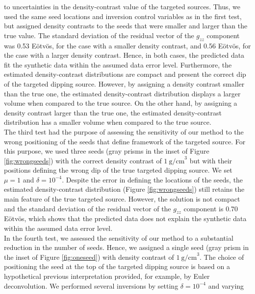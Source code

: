to uncertainties in the density-contrast value of the targeted sources.
Thus, we used the same seed locations and inversion control variables as in the
first test, but assigned density contrasts to the seeds that were smaller and
larger than the true value.
The standard deviation of the residual vector of the $g_{zz}$ component
was 0.53 E\"otv\"os,
for the case with a smaller density contrast,
and 0.56 E\"otv\"os, for the case with a larger density contrast.
Hence, in both cases,
the predicted data fit the synthetic data
within the assumed data error level.
Furthermore, the estimated density-contrast distributions
\citep[see Figures 2 and 3 in the supplementary material of][]{Uieda2012b}
are compact and present the correct dip of the targeted dipping source.
However, by assigning a density contrast smaller than the true one, the
estimated density-contrast distribution
\citep[see Figure 2 in][]{Uieda2012b}
displays a larger volume when compared to the true source.
On the other hand, by assigning a density contrast larger than the true one,
the estimated density-contrast distribution
\citep[see Figure 3 in][]{Uieda2012b}
has a smaller volume when compared to the true source.
\\ \indent
The third test had the purpose of assessing the sensitivity of our method
to the wrong positioning of the seeds that define framework of the targeted
source.
For this purpose, we used three seeds
(gray prisms in the inset of Figure \ref{fig:wrongseeds})
with the correct density contrast of $1\ \mathrm{g/cm}^3$
but with their positions defining the wrong dip of the true targeted dipping
source.
We set $\mu=1$ and $\delta=10^{-4}$.
Despite the error in defining the locations of the seeds, the estimated
density-contrast distribution
(Figure \ref{fig:wrongseeds})
still retains the main feature of the true targeted source.
However, the solution is not compact and
the standard deviation of the residual vector of the $g_{zz}$ component
is 0.70 E\"otv\"os,
which shows that the predicted data does not explain
the synthetic data
within the assumed data error level.
\\ \indent
In the fourth test, we assessed the sensitivity of our method to a substantial
reduction in the number of seeds.
Hence, we assigned a single seed
(gray prism in the inset of Figure \ref{fig:oneseed})
with density contrast of $1\ \mathrm{g/cm}^3$.
The choice of positioning the seed at the top of the targeted dipping source is
based on a hypothetical previous interpretation provided, for example, by Euler
deconvolution.
We performed several inversions by setting $\delta=10^{-4}$ and varying
